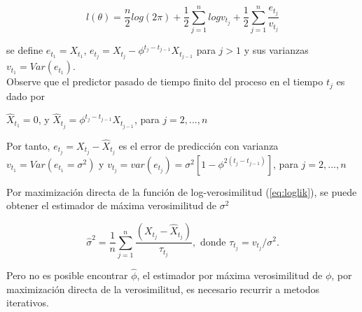\begin{equation}
	l(\theta) = \frac{n}{2}log(2\pi) + \frac{1}{2}\sum_{j=1}^{n} log v_{t_j} +  \frac{1}{2}\sum_{j=1}^{n}\frac{e_{t_j}}{v_{t_j}}
	\label{eq:loglik}
\end{equation}

se define $e_{t_1} = X_{t_1}$, $e_{t_j} = X_{t_j}-\phi^{t_j-t_{j-1}}X_{t_{j-1}}$ para $j>1$ y sus varianzas $v_{t_1} = Var(e_{t_1}) $.\\

Observe que el predictor pasado de tiempo finito del proceso en el tiempo $t_j$ es dado por 

$\hat{X}_{t_1} = 0$, y $\hat{X}_{t_j} = \phi^{t_j - t_{j-1}} X_{t_{j-1}}$, para $j = 2, ... , n$ 

Por tanto, $e_{t_j} = X_{t_j} - \hat{X}_{t_j}$ es el error de predicción con varianza $v_{t_1} = Var(e_{t_1} = \sigma^2)$ y
$v_{t_j} = var(e_{t_j}) = \sigma^2[1 - \phi^{2(t_j - t_{j-1})}]$, para $j = 2, ... , n$ 

Por maximización directa de la función de log-verosimilitud (\ref{eq:loglik}), se puede obtener el estimador de máxima verosimilitud de $\sigma^2$

\begin{equation}
	\hat{\sigma}^2 = \frac{1}{n} \sum_{j=1}^{n} \frac{\left(X_{t_j} - \hat{X}_{t_j}\right)}{\tau_{t_j}}, \text{ donde } \tau_{t_j} = v_{t_j}/\sigma^2.
\end{equation}

Pero no es posible encontrar $\hat{\phi}$, el estimador por máxima verosimilitud de $\phi$, por maximización directa de la verosimilitud, es necesario
recurrir a metodos iterativos. 

